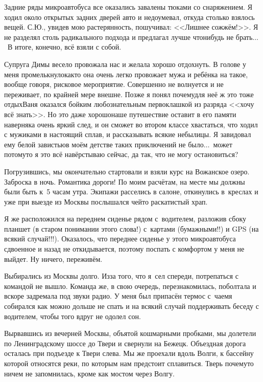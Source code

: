 Задние ряды микроавтобуса все оказались завалены тюками со снаряжением. Я ходил около открытых задних дверей авто и недоумевал, откуда столько взялось вещей. С.Ю., увидев мою растерянность, пошучивал: <<Лишнее сожжём!>>. Я не разделял столь радикального подхода и предлагал лучше что\sdash нибудь не брать$\ldots$~В итоге, конечно, всё взяли с собой.

Супруга Димы весело провожала нас и желала хорошо отдохнуть. В голове у меня промелькнуло\mdash как\sdash то она очень легко провожает мужа и ребёнка на такое, вообще говоря, рисковое мероприятие. Совершенно не волнуется и не переживает, по крайней мере внешне. Позже я понял почему\mdash для неё ж это тоже отдых\mdash Ваня оказался бойким любознательным первоклашкой из разряда <<хочу всё знать>>. Но это даже хорошо\mdash наше путешествие оставит в его памяти наверняка очень яркий след, и он сможет во втором классе хвастаться, что ходил с мужиками в настоящий сплав, и рассказывать всякие небылицы. Я завидовал ему белой завистью\mdash в моём детстве таких приключений не было$\ldots$~может потому\sdash то я это всё навёрстываю сейчас, да так, что не могу остановиться?

Погрузившись, мы окончательно стартовали и взяли курс на Вожанское озеро. Заброска в ночь. Романтика дороги! По моим расчётам, на месте мы должны были быть к~5\thinspace\nbdash{} часам утра. Экипажи расселись в салоне, откинулись в~креслах и уже при выезде из Москвы послышался чей\sdash то раскатистый храп.

Я же расположился на переднем сиденье рядом с~водителем, разложив сбоку планшет (в старом понимании этого слова!) с~картами (бумажными!!) и GPS (на всякий случай!!!). Оказалось, что переднее сиденье у этого микроавтобуса сдвоенное и назад не откидывается, поэтому поспать с комфортом у меня не выйдет. Ну ничего, переживём. 

Выбирались из Москвы долго. Из\sdash за того, что я~сел спереди, потрепаться с командой не вышло. Команда же, в свою очередь, перезнакомилась, поболтала и вскоре задремала под звуки радио. У меня был припасён термос с~чаем\mdash я собирался как можно дольше не спать и на всякий случай поддерживать беседу с водителем, чтобы того вдруг не одолел сон. 

Вырвавшись из вечерней Москвы, объятой кошмарными пробками, мы долетели по Ленинградскому шоссе до Твери и свернули на Бежецк. Объездная дорога осталась при подъезде к Твери слева. Мы же проехали вдоль Волги, к бассейну которой относятся реки, по которым нам предстоит сплавиться. Тверь почему\sdash то ничем не запомнилась, кроме как мостом через Волгу. 

